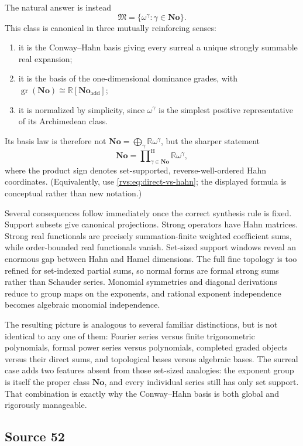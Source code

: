\documentclass[11pt,letterpaper]{article}
\numberwithin{equation}{section}
\theoremstyle{definition}
\theoremstyle{remark}
\newcommand{\No}{\mathbf{No}}
\newcommand{\R}{\mathbb{R}}
\newcommand{\M}{\mathfrak{M}}
\newcommand{\gr}{\operatorname{gr}}
\newcommand{\classprod}{\mathop{\prod}\nolimits^{\mathrm H}}
\begin{document}
The natural answer is instead
\[
  \boxed{\M=\{\omega^\gamma:\gamma\in\No\}}.
\]
This class is canonical in three mutually reinforcing senses:
\begin{enumerate}
\item it is the Conway--Hahn basis giving every surreal a unique strongly
summable real expansion;
\item it is the basis of the one-dimensional dominance grades, with
\(\gr(\No)\cong\R[\No_{\mathrm{add}}]\);
\item it is normalized by simplicity, since \(\omega^\gamma\) is the
simplest positive representative of its Archimedean class.
\end{enumerate}
Its basis law is therefore not
\(\No=\bigoplus_\gamma\R\omega^\gamma\), but the sharper statement
\[
  \No=\classprod_{\gamma\in\No}\R\omega^\gamma,
\]
where the product sign denotes set-supported, reverse-well-ordered Hahn
coordinates.  (Equivalently, use \eqref{rvs:eq:direct-vs-hahn}; the displayed
formula is conceptual rather than new notation.)

Several consequences follow immediately once the correct synthesis rule is
fixed.  Support subsets give canonical projections.  Strong operators have
Hahn matrices.  Strong real functionals are precisely summation-finite
weighted coefficient sums, while order-bounded real functionals vanish.
Set-sized support windows reveal an enormous gap between Hahn and Hamel
dimensions.  The full fine topology is too refined for set-indexed partial
sums, so normal forms are formal strong sums rather than Schauder series.
Monomial symmetries and diagonal derivations reduce to group maps on the
exponents, and rational exponent independence becomes algebraic monomial
independence.

The resulting picture is analogous to several familiar distinctions, but is
not identical to any one of them: Fourier series versus finite trigonometric
polynomials, formal power series versus polynomials, completed graded objects
versus their direct sums, and topological bases versus algebraic bases.  The
surreal case adds two features absent from those set-sized analogies: the
exponent group is itself the proper class \(\No\), and every individual
series still has only set support.  That combination is exactly why the
Conway--Hahn basis is both global and rigorously manageable.

\subsection{Source 52}
\end{document}

